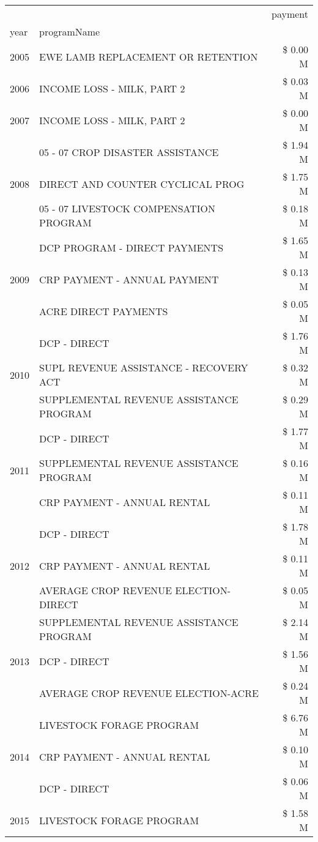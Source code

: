 \begin{tabular}{llr}
\toprule
 &  & payment \\
year & programName &  \\
\midrule
2005 & EWE LAMB REPLACEMENT OR RETENTION & \$ 0.00 M \\
\cline{1-3}
2006 & INCOME LOSS - MILK, PART 2 & \$ 0.03 M \\
\cline{1-3}
2007 & INCOME LOSS - MILK, PART 2 & \$ 0.00 M \\
\cline{1-3}
\multirow[t]{3}{*}{2008} & 05 - 07 CROP DISASTER ASSISTANCE & \$ 1.94 M \\
 & DIRECT AND COUNTER CYCLICAL PROG & \$ 1.75 M \\
 & 05 - 07 LIVESTOCK COMPENSATION PROGRAM & \$ 0.18 M \\
\cline{1-3}
\multirow[t]{3}{*}{2009} & DCP PROGRAM - DIRECT PAYMENTS & \$ 1.65 M \\
 & CRP PAYMENT - ANNUAL PAYMENT & \$ 0.13 M \\
 & ACRE DIRECT PAYMENTS & \$ 0.05 M \\
\cline{1-3}
\multirow[t]{3}{*}{2010} & DCP - DIRECT & \$ 1.76 M \\
 & SUPL REVENUE ASSISTANCE - RECOVERY ACT & \$ 0.32 M \\
 & SUPPLEMENTAL REVENUE ASSISTANCE PROGRAM & \$ 0.29 M \\
\cline{1-3}
\multirow[t]{3}{*}{2011} & DCP - DIRECT & \$ 1.77 M \\
 & SUPPLEMENTAL REVENUE ASSISTANCE PROGRAM & \$ 0.16 M \\
 & CRP PAYMENT - ANNUAL RENTAL & \$ 0.11 M \\
\cline{1-3}
\multirow[t]{3}{*}{2012} & DCP - DIRECT & \$ 1.78 M \\
 & CRP PAYMENT - ANNUAL RENTAL & \$ 0.11 M \\
 & AVERAGE CROP REVENUE ELECTION-DIRECT & \$ 0.05 M \\
\cline{1-3}
\multirow[t]{3}{*}{2013} & SUPPLEMENTAL REVENUE ASSISTANCE PROGRAM & \$ 2.14 M \\
 & DCP - DIRECT & \$ 1.56 M \\
 & AVERAGE CROP REVENUE ELECTION-ACRE & \$ 0.24 M \\
\cline{1-3}
\multirow[t]{3}{*}{2014} & LIVESTOCK FORAGE PROGRAM & \$ 6.76 M \\
 & CRP PAYMENT - ANNUAL RENTAL & \$ 0.10 M \\
 & DCP - DIRECT & \$ 0.06 M \\
\cline{1-3}
\multirow[t]{3}{*}{2015} & LIVESTOCK FORAGE PROGRAM & \$ 1.58 M \\

\end{tabular}
